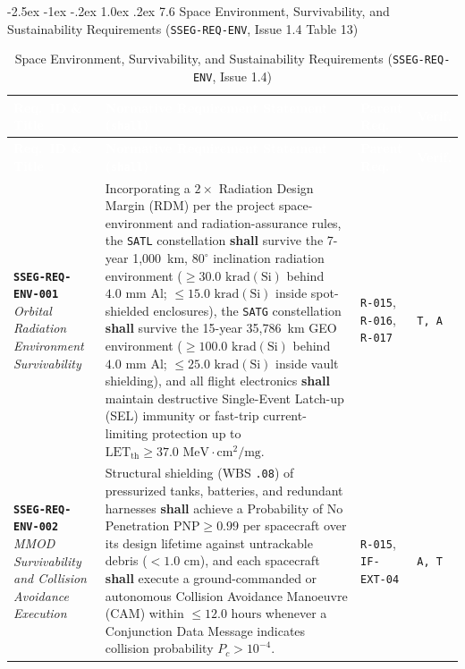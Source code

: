 \documentclass[11pt,a4paper]{article}
\makeatletter
\renewcommand\subsection{\@startsection{subsection}{2}{\z@}%
    {-2.5ex \@plus -1ex \@minus -.2ex}%
    {1.0ex \@plus .2ex}%
    {\normalfont\large\bfseries\sffamily\color{SubHeadingBlue}}}
\newcommand{\thead}[1]{\textcolor{white}{\textbf{\textsf{#1}}}}
\providecommand{\abbr}[1]{#1}
\makeatother
\begin{document}
\subsection{7.6 Space Environment, Survivability, and Sustainability Requirements (\texttt{SSEG-REQ-ENV}, Issue 1.4 Table 13)}

{\footnotesize\setlength{\tabcolsep}{4pt}\renewcommand{\arraystretch}{1.15}%
%
%
\setlength{\LTcapwidth}{\textwidth}%
\begin{longtable}{|>{\raggedright\arraybackslash}p{}|>{\raggedright\arraybackslash}p{}|>{\raggedright\arraybackslash}p{}|>{\raggedright\arraybackslash}p{}|}
\caption{Space Environment, Survivability, and Sustainability Requirements (\texttt{SSEG-REQ-ENV}, Issue 1.4)}\label{tab:req_env_i14}\\
\hline
\rowcolor{TableHeaderBlue}
\thead{Req.\ ID \& Title} & \thead{Normative Requirement Statement (\texttt{shall})} & \thead{Parent Req.} & \thead{Verif.} \\ \hline
\endfirsthead
\hline
\rowcolor{TableHeaderBlue}
\thead{Req.\ ID \& Title} & \thead{Normative Requirement Statement (\texttt{shall})} & \thead{Parent Req.} & \thead{Verif.} \\ \hline
\endhead
\endfoot
\endlastfoot
\textbf{\texttt{SSEG-REQ-ENV-001}} \newline \emph{Orbital Radiation Environment Survivability} & Incorporating a $2\times$ Radiation Design Margin (\abbr{RDM}) per the project space-environment and radiation-assurance rules, the \texttt{SATL} constellation \textbf{shall} survive the 7-year 1,000~km, $80^\circ$ inclination radiation environment ($\ge 30.0\text{ krad}(\mathrm{Si})$ behind $4.0\text{ mm}$ $\mathrm{Al}$; $\le 15.0\text{ krad}(\mathrm{Si})$ inside spot-shielded enclosures), the \texttt{SATG} constellation \textbf{shall} survive the 15-year 35,786~km \abbr{GEO} environment ($\ge 100.0\text{ krad}(\mathrm{Si})$ behind $4.0\text{ mm}$ $\mathrm{Al}$; $\le 25.0\text{ krad}(\mathrm{Si})$ inside vault shielding), and all flight electronics \textbf{shall} maintain destructive Single-Event Latch-up (\abbr{SEL}) immunity or fast-trip current-limiting protection up to $\text{LET}_{\text{th}} \ge 37.0\text{ MeV}\cdot\text{cm}^2/\text{mg}$. & \texttt{R-015}, \texttt{R-016}, \texttt{R-017} & \texttt{T, A} \\ \hline
\textbf{\texttt{SSEG-REQ-ENV-002}} \newline \emph{MMOD Survivability and Collision Avoidance Execution} & Structural shielding (\abbr{WBS} \texttt{.08}) of pressurized tanks, batteries, and redundant harnesses \textbf{shall} achieve a Probability of No Penetration $\text{PNP} \ge 0.99$ per spacecraft over its design lifetime against untrackable debris ($< 1.0\text{ cm}$), and each spacecraft \textbf{shall} execute a ground-commanded or autonomous Collision Avoidance Manoeuvre (\abbr{CAM}) within $\le 12.0\text{ hours}$ whenever a Conjunction Data Message indicates collision probability $P_c > 10^{-4}$. & \texttt{R-015}, \texttt{IF-EXT-04} & \texttt{A, T} \\ \hline

\end{longtable}}
\end{document}
